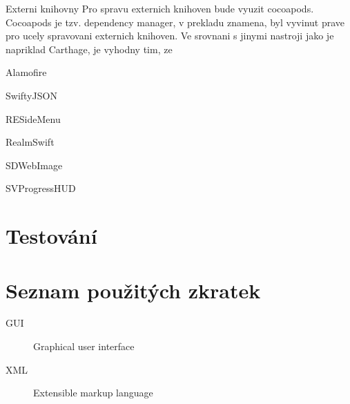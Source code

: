 \documentclass[thesis=B,czech]{FITthesis}[2012/06/26]
\begin{document}
Externi knihovny
Pro spravu externich knihoven bude vyuzit cocoapods. Cocoapods 
je tzv. dependency manager, v prekladu znamena, byl vyvinut prave pro ucely spravovani externich knihoven. Ve srovnani s jinymi nastroji jako je napriklad Carthage, je vyhodny tim, ze 

Alamofire

SwiftyJSON

RESideMenu

RealmSwift

SDWebImage

SVProgressHUD


\chapter{Testování}

\begin{conclusion}
\end{conclusion}




\appendix

\chapter{Seznam použitých zkratek}
\begin{description}
	\item[GUI] Graphical user interface
	\item[XML] Extensible markup language
\end{description}
\end{document}
